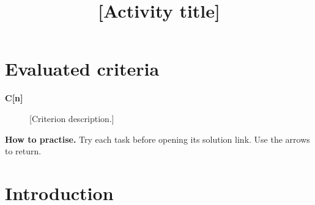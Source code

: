 \makeatletter
{}
\makeatother






\title{[Activity title]}
\author{}
\date{}


\maketitle

\setcounter{tocdepth}{1}
\setcounter{secnumdepth}{2}
\label{toc}
\tableofcontents

\section*{Evaluated criteria}
\begin{description}
    \item[\textbf{C[n]}] [Criterion description.]
\end{description}

\textbf{How to practise.} Try each task before opening its solution link. Use the arrows to return.

\clearpage
\section{Introduction}\label{sec:introduction}

